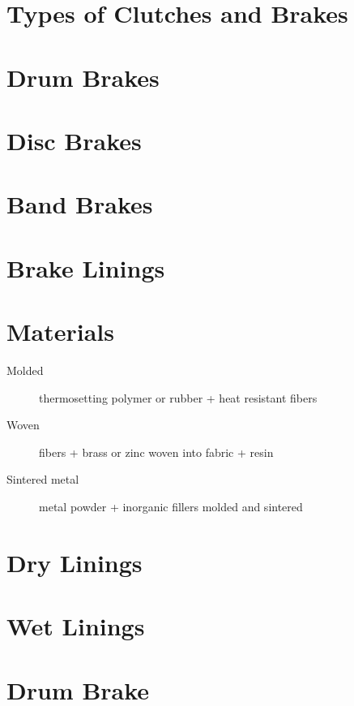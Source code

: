 \documentclass[a4paper,openany]{tufte-book}
\begin{document}
\section{Types of Clutches and Brakes}
\label{sec:org98e7cf5}
\section{Drum Brakes}
\label{sec:orge409bf6}


\section{Disc Brakes}
\label{sec:org718ae68}


\section{Band Brakes}
\label{sec:org7b1cdbd}


\section{Brake Linings}
\label{sec:orge6ce153}
\section{Materials}
\label{sec:org8a9dddd}
\begin{description}
\item[{Molded}] thermosetting polymer or rubber + heat resistant fibers

\item[{Woven}] fibers + brass or zinc woven into fabric + resin

\item[{Sintered metal}] metal powder + inorganic fillers molded and sintered
\end{description}

\section{Dry Linings}
\label{sec:orge23bb3c}


\section{Wet Linings}
\label{sec:orgd59eddb}


\section{Drum Brake}
\label{sec:org2ef3aaf}
\end{document}
